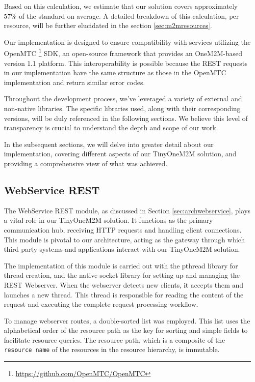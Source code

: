 \documentclass[a4paper,fleqn]{cas-dc}
\begin{document}
Based on this calculation, we estimate that our solution covers approximately 57\% of the standard on average. A detailed breakdown of this calculation, per resource, will be further elucidated in the section \ref{sec:m2mresources}.

Our implementation is designed to ensure compatibility with services utilizing the OpenMTC \footnote{\url{https://github.com/OpenMTC/OpenMTC}} SDK, an open-source framework that provides an OneM2M-based version 1.1 platform. This interoperability is possible because the REST requests in our implementation have the same structure as those in the OpenMTC implementation and return similar error codes.

Throughout the development process, we've leveraged a variety of external and non-native libraries. The specific libraries used, along with their corresponding versions, will be duly referenced in the following sections. We believe this level of transparency is crucial to understand the depth and scope of our work.

In the subsequent sections, we will delve into greater detail about our implementation, covering different aspects of our TinyOneM2M solution, and providing a comprehensive view of what was achieved.

\subsection{WebService REST}

The WebService REST module, as discussed in Section \ref{sec:archwebservice}, plays a vital role in our TinyOneM2M solution. It functions as the primary communication hub, receiving HTTP requests and handling client connections. This module is pivotal to our architecture, acting as the gateway through which third-party systems and applications interact with our TinyOneM2M solution.

The implementation of this module is carried out with the pthread library for thread creation, and the native socket library for setting up and managing the REST Webserver. When the webserver detects new clients, it accepts them and launches a new thread. This thread is responsible for reading the content of the request and executing the complete request processing workflow.

To manage webserver routes, a double-sorted list was employed. This list uses the alphabetical order of the resource path as the key for sorting and simple fields to facilitate resource queries. The resource path, which is a composite of the \texttt{resource name} of the resources in the resource hierarchy, is immutable.
\end{document}
